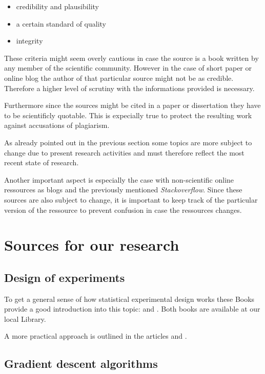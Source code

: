 \documentclass[titlepage, a4paper, 11pt]{scrartcl}
\begin{document}
\begin{itemize}
    \item credibility and plausibility
    \item a certain standard of quality
    \item integrity
\end{itemize}

These criteria might seem overly cautious in case the source is a book written by any member of the scientific community. However in the case of short paper or online blog
the author of that particular source might not be as credible. Therefore a higher level of scrutiny with the informations provided is necessary.

Furthermore since the sources might be cited in a paper or dissertation they have to be scientificly quotable. This is expecially true to protect the resulting work against 
accusations of plagiarism.

As already pointed out in the previous section some topics are more subject to change due to present research activities
and must therefore reflect the most recent state of research. 

Another important aspect is especially the case with non-scientific online ressources as blogs and the previously mentioned
\textit{Stackoverflow}. Since these sources are also subject to change, it is important to keep track of the particular
version of the ressource to prevent confusion in case the ressources changes.

\section{Sources for our research}

\subsection{Design of experiments}

To get a general sense of how statistical experimental design works these Books provide a good introduction into this topic: \citep{siebertz2017statistische} and \citep{retzlaff1978statistische}.
Both books are available at our local Library.

A more practical approach is outlined in the articles \citep{hoevelmann1993statistische} and \citep{schweitzer1992off}.


\subsection{Gradient  descent  algorithms}
\end{document}
